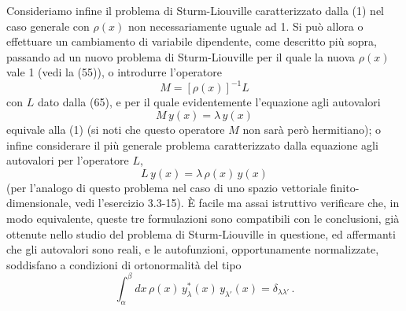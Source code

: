 \documentclass[11pt, a4paper]{book}
\numberwithin{equation}{section}
\begin{document}
Consideriamo infine il problema di Sturm-Liouville caratterizzato dalla (1) nel caso generale con $\rho(x)$ non necessariamente uguale ad 1. Si può
allora o effettuare un cambiamento di variabile dipendente, come descritto
più sopra, passando ad un nuovo problema di Sturm-Liouville per il quale
la nuova $\rho(x)$ vale 1 (vedi la (55)), o introdurre l'operatore
\begin{equation}
M = \left[\rho(x)\right]^{-1} L \tag{67}
\end{equation}
con $L$ dato dalla (65), e per il quale evidentemente l'equazione agli autovalori
\begin{equation}
M\, y(x) = \lambda\, y(x) \tag{68}
\end{equation}
equivale alla (1) (si noti che questo operatore $M$ non sarà però hermitiano);
o infine considerare il più generale problema caratterizzato dalla equazione
agli autovalori per l'operatore $L$,
\begin{equation}
L\, y(x) = \lambda\, \rho(x)\, y(x) \tag{69}
\end{equation}
(per l'analogo di questo problema nel caso di uno spazio vettoriale finito-dimensionale, vedi l'esercizio 3.3-15). È facile ma assai istruttivo
verificare che, in modo equivalente, queste tre formulazioni sono compatibili
con le conclusioni, già ottenute nello studio del problema di Sturm-Liouville
in questione, ed affermanti che gli autovalori sono reali, e le autofunzioni, opportunamente normalizzate, soddisfano a condizioni di ortonormalità del tipo
\begin{equation}
\int_\alpha^\beta dx\, \rho(x)\, y^*_\lambda(x)\, y_{\lambda'}(x) = \delta_{\lambda\lambda'} \,. \tag{70}
\end{equation}

\end{document}
